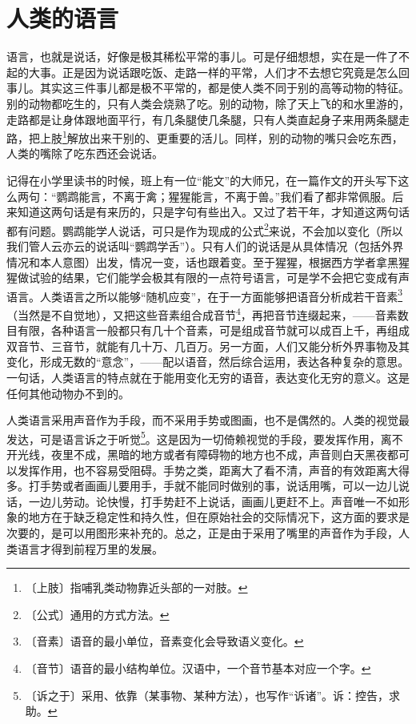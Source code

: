 \documentclass[12pt,UTF-8,openany]{ctexbook}
\begin{document}
\chapter{人类的语言}

\begin{normalsize}
    
    语言，也就是说话，好像是极其稀松平常的事儿。可是仔细想想，实在是一件了不起的大事。正是因为说话跟吃饭、走路一样的平常，人们才不去想它究竟是怎么回事儿。其实这三件事儿都是极不平常的，都是使人类不同于别的高等动物的特征。别的动物都吃生的，只有人类会烧熟了吃。别的动物，除了天上飞的和水里游的，走路都是让身体跟地面平行，有几条腿使几条腿，只有人类直起身子来用两条腿走路，把上肢\footnote{〔上肢〕指哺乳类动物靠近头部的一对肢。}解放出来干别的、更重要的活儿。同样，别的动物的嘴只会吃东西，人类的嘴除了吃东西还会说话。
    
    记得在小学里读书的时候，班上有一位“能文”的大师兄，在一篇作文的开头写下这么两句：“鹦鹉能言，不离于禽；猩猩能言，不离于兽。”我们看了都非常佩服。后来知道这两句话是有来历的，只是字句有些出入。又过了若干年，才知道这两句话都有问题。鹦鹉能学人说话，可只是作为现成的公式\footnote{〔公式〕通用的方式方法。}来说，不会加以变化（所以我们管人云亦云的说话叫“鹦鹉学舌”）。只有人们的说话是从具体情况（包括外界情况和本人意图）出发，情况一变，话也跟着变。至于猩猩，根据西方学者拿黑猩猩做试验的结果，它们能学会极其有限的一点符号语言，可是学不会把它变成有声语言。人类语言之所以能够“随机应变”，在于一方面能够把语音分析成若干音素\footnote{〔音素〕语音的最小单位，音素变化会导致语义变化。}（当然是不自觉地），又把这些音素组合成音节\footnote{〔音节〕语音的最小结构单位。汉语中，一个音节基本对应一个字。}，再把音节连缀起来，——音素数目有限，各种语言一般都只有几十个音素，可是组成音节就可以成百上千，再组成双音节、三音节，就能有几十万、几百万。另一方面，人们又能分析外界事物及其变化，形成无数的“意念”，——配以语音，然后综合运用，表达各种复杂的意思。一句话，人类语言的特点就在于能用变化无穷的语音，表达变化无穷的意义。这是任何其他动物办不到的。
    
    人类语言采用声音作为手段，而不采用手势或图画，也不是偶然的。人类的视觉最发达，可是语言诉之于听觉\footnote{〔诉之于〕采用、依靠（某事物、某种方法），也写作“诉诸”。诉：控告，求助。}。这是因为一切倚赖视觉的手段，要发挥作用，离不开光线，夜里不成，黑暗的地方或者有障碍物的地方也不成，声音则白天黑夜都可以发挥作用，也不容易受阻碍。手势之类，距离大了看不清，声音的有效距离大得多。打手势或者画画儿要用手，手就不能同时做别的事，说话用嘴，可以一边儿说话，一边儿劳动。论快慢，打手势赶不上说话，画画儿更赶不上。声音唯一不如形象的地方在于缺乏稳定性和持久性，但在原始社会的交际情况下，这方面的要求是次要的，是可以用图形来补充的。总之，正是由于采用了嘴里的声音作为手段，人类语言才得到前程万里的发展。
    
\end{normalsize}
\end{document}
